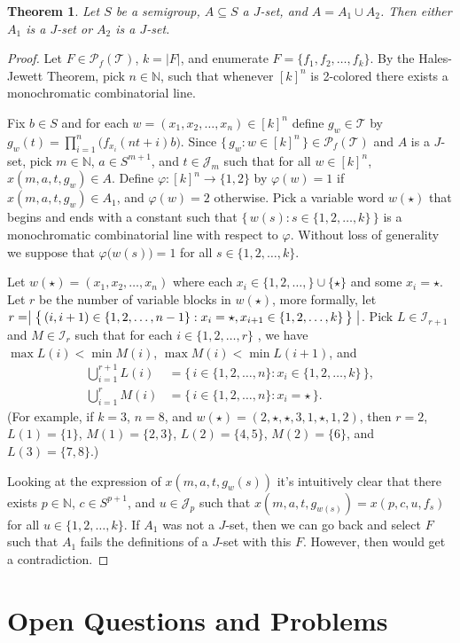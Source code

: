 \documentclass[12pt]{article}
\theoremstyle{plain}
\newtheorem{thm}{Theorem}[section]
\theoremstyle{definition}
\newcommand{\bbN}{\mathbb{N}}
\newcommand{\calI}{\mathcal{I}}
\newcommand{\calJ}{\mathcal{J}}
\newcommand{\calT}{\mathcal{T}}
\newcommand{\Pf}{\mathcal{P}_f}
\begin{document}
\begin{thm}
  Let $S$ be a semigroup, $A \subseteq S$ a $J$-set, and $A = A_1 \cup
  A_2$. 
  Then either $A_1$ is a $J$-set or $A_2$ is a $J$-set. 
\end{thm}
\begin{proof}
  Let $F \in \Pf(\calT)$, $k = |F|$, and enumerate $F = \{ f_1, f_2,
  \ldots, f_k \}$. 
  By the Hales-Jewett Theorem, pick $n \in \bbN$, such that whenever
  $[k]^n$ is 2-colored there exists a monochromatic combinatorial
  line.
  
  Fix $b \in S$ and for each $w = (x_1, x_2, \ldots, x_n) \in [k]^n$
  define $g_w \in \calT$ by $g_w(t) = \prod_{i=1}^n
  \bigr(f_{x_i}(nt+i)b\bigr)$.
  Since $\{\, g_w : w \in [k]^n \,\} \in \Pf(\calT)$ and $A$ is a
  $J$-set, pick $m \in \bbN$, $a \in S^{m+1}$, and $t \in \calJ_m$
  such that for all $w \in [k]^n$, $x(m, a, t, g_w) \in A$.
  Define $\varphi \colon [k]^n \to \{1, 2\}$ by $\varphi(w) = 1 $ if
  $x(m, a, t, g_w) \in A_1$, and $\varphi(w) = 2$ otherwise.
  Pick a variable word $w(\star)$ that begins and ends with a constant
  such that $\bigl\{\, w(s) : s \in
  \{1, 2, \ldots, k\} \,\bigr\}$ is a monochromatic combinatorial line
  with respect to $\varphi$.
  Without loss of generality we suppose that $\varphi\bigl(w(s)\bigr)
  = 1$ for all $s \in \{1, 2, \ldots, k\}$. 

  Let $w(\star) = (x_1, x_2, \ldots, x_n)$ where each $x_i \in \{1, 2,
  \ldots, \} \cup \{\star\}$ and some $x_i = \star$. 
  Let $r$ be the number of variable blocks in $w(\star)$, more
  formally, let $r = \bigm|\bigl\{\, (i, i+1) \in \{1, 2, \ldots, n-1\} :
  x_i = \star, x_{i+1} \in \{1, 2, \ldots, k\} \,\bigr\}\bigm|$.
  Pick $L \in \calI_{r+1}$ and $M \in \calI_r$ such that for each $i
  \in \{1, 2, \ldots, r\}$ , we have $\max L(i) < \min M(i)$, $\max
  M(i) < \min L(i+1)$, and 
  \begin{align*}
    \bigcup_{i=1}^{r+1} L(i) &= \bigl\{\, i \in \{1, 2, \ldots, n \} :
    x_i \in \{1, 2, \ldots, k\} \,\bigr\}, \\
    \bigcup_{i=1}^r M(i) &= \bigl\{\, i \in \{1, 2, \ldots, n \} : x_i
    = \star \,\bigr\}.
  \end{align*}
  (For example, if $k = 3$, $n = 8$, and $w(\star) = (2, \star, \star,
  3, 1, \star, 1, 2)$, then $r = 2$, $L(1) = \{1\}$, $M(1) = \{2,
  3\}$, $L(2) = \{4, 5\}$, $M(2) = \{6\}$, and $L(3) = \{7, 8\}$.)
  
  Looking at the expression of $x(m, a, t, g_w(s))$ it's intuitively
  clear that there exists $p \in \bbN$, $c \in S^{p+1}$, and $u \in
  \calJ_p$ such that $x(m, a, t, g_{w(s)}) = x(p, c, u, f_s)$ for all
  $u \in \{1, 2, \ldots, k\}$. 
  If $A_1$ was not a $J$-set, then  we can go back and select $F$ such
  that $A_1$ fails the definitions of a $J$-set with this $F$. 
  However, then would get a contradiction. 
\end{proof}

\section{Open Questions and Problems}

\theendnotes



\end{document}
